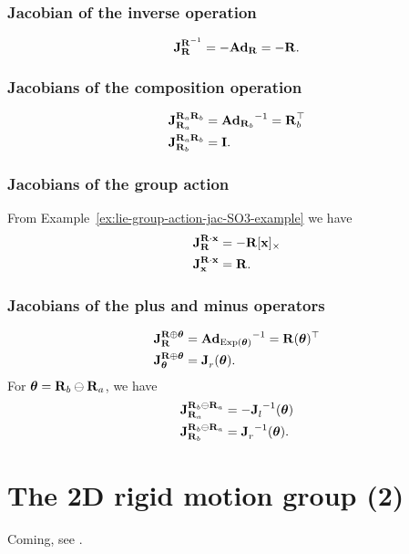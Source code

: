 \subsubsection*{Jacobian of the inverse operation}
\begin{equation}
  \jac{\matR^{-1}}{\matR} = -\mAd_\matR = -\matR.
\end{equation}

\subsubsection*{Jacobians of the composition operation}
\begin{align}
  \jac{\matR_a \matR_b}{\matR_a} &= {\mAd_{\matR_b}}^{-1} = \matR_b\trans\\
  \jac{\matR_a \matR_b}{\matR_b} &= \matI.
\end{align}

\subsubsection*{Jacobians of the group action}
From Example~\ref{ex:lie-group-action-jac-SO3-example} we have
\begin{align}
  \jac{\matR \cdot \vecx}{\matR} &= -\matR [\vecx]_\times\\
  \jac{\matR \cdot \vecx}{\vecx} &= \matR.
\end{align}

\subsubsection*{Jacobians of the plus and minus operators}
\begin{align}
  \jac{\matR \oplus \vectheta}{\matR} &= {\mAd_{\Exp(\vectheta)}}^{-1} = \matR(\vectheta)\trans\\
  \jac{\matR \oplus \vectheta}{\vectheta} &= \jac{}{r}(\vectheta).
\end{align}
For $\vectheta = \matR_b \ominus \matR_a$, we have
\begin{align}
  \jac{\matR_b \ominus \matR_a}{\matR_a} &= -\jac{}{l}^{-1}(\vectheta)\\
  \jac{\matR_b \ominus \matR_a}{\matR_b} &= \jac{}{r}^{-1}(\vectheta).
\end{align}

\section{The 2D rigid motion group \SE(2)} \label{sec:SE2_group}
Coming, see \cite{SolaARobotics}.

